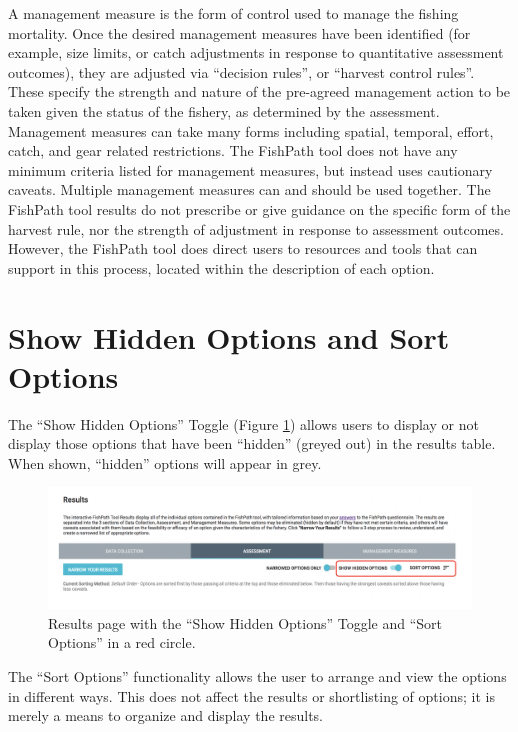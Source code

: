 \documentclass[
  11pt,
]{book}
\begin{document}
A management measure is the form of control used to manage the fishing mortality. Once the desired management measures have been identified (for example, size limits, or catch adjustments in response to quantitative assessment outcomes), they are adjusted via ``decision rules'', or ``harvest control rules''. These specify the strength and nature of the pre-agreed management action to be taken given the status of the fishery, as determined by the assessment. Management measures can take many forms including spatial, temporal, effort, catch, and gear related restrictions. The FishPath tool does not have any minimum criteria listed for management measures, but instead uses cautionary caveats. Multiple management measures can and should be used together. The FishPath tool results do not prescribe or give guidance on the specific form of the harvest rule, nor the strength of adjustment in response to assessment outcomes. However, the FishPath tool does direct users to resources and tools that can support in this process, located within the description of each option.

\hypertarget{show-hidden-options-and-sort-options}{%
\section{Show Hidden Options and Sort Options}\label{show-hidden-options-and-sort-options}}

The ``Show Hidden Options'' Toggle (Figure \ref{fig:show-hidden-sort}) allows users to display or not display those options that have been ``hidden'' (greyed out) in the results table. When shown, ``hidden'' options will appear in grey.

\begin{figure}

{\centering \includegraphics[width=0.75\linewidth]{images/show-hidden-options-and-sort} 

}

\caption{Results page with the “Show Hidden Options” Toggle and “Sort Options” in a red circle.}\label{fig:show-hidden-sort}
\end{figure}

The ``Sort Options'' functionality allows the user to arrange and view the options in different ways. This does not affect the results or shortlisting of options; it is merely a means to organize and display the results.
\end{document}
